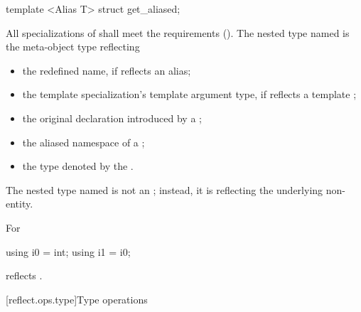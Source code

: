 \begin{std.txt}\color{addclr}

\begin{itemdecl}
template <Alias T> struct get_aliased;
\end{itemdecl}

\begin{itemdescr}
\pnum
All specializations of  shall meet the  requirements (). The nested type named  is the  meta-object type reflecting
\begin{itemize}
\item the redefined name, if  reflects an alias;
\item the template specialization's template argument type, if  reflects a template ;
\item the original declaration introduced by a ;
\item the aliased namespace of a ;
\item the type denoted by the .
\end{itemize}

\pnum
The nested type named  is not an ; instead, it is reflecting the underlying non- entity.

\pnum
\begin{example}
For
\begin{codeblock}
using i0 = int; using i1 = i0;
\end{codeblock}
 reflects .
\end{example}

\end{itemdescr}
\end{std.txt}

[reflect.ops.type]{Type operations}


